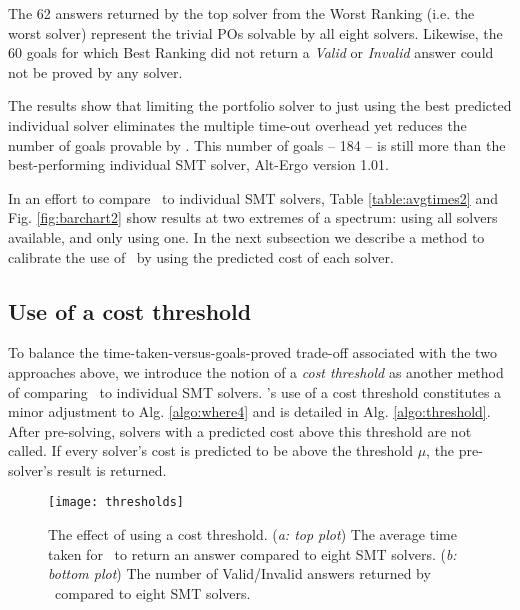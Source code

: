 The 62  answers returned by the top solver from the \textsf{Worst Ranking} (i.e. the worst solver) represent the trivial POs solvable by all eight solvers. 
Likewise, the 60 goals for which \textsf{Best Ranking} did not return a \textit{Valid} or \textit{Invalid} answer could not be proved by any solver.

The results show that limiting the portfolio solver to just using the best predicted individual solver eliminates the multiple time-out overhead yet reduces the number of goals provable by \where.
This number of goals -- 184 -- is still more than the best-performing individual SMT solver, Alt-Ergo version 1.01.  

In an effort to compare \where~to individual SMT solvers, Table \ref{table:avgtimes2} and Fig. \ref{fig:barchart2} show results at two extremes of a spectrum: using all solvers available, and only using one.
In the next subsection we describe a method to calibrate the use of \where~by using the predicted cost of each solver. 


\subsection{Use of a cost threshold}
\label{sub:threshold}

To balance the time-taken-versus-goals-proved trade-off associated with the two approaches above, we introduce the notion of a \textit{cost threshold} as another method of comparing \where~to individual SMT solvers.
\where's use of a cost threshold constitutes a minor adjustment to Alg. \ref{algo:where4} and is detailed in Alg. \ref{algo:threshold}. 
After pre-solving, solvers with a predicted cost above this threshold are not called. 
If every solver's cost is predicted to be above the threshold $\mu$, the pre-solver's result is returned.


\begin{figure}
	\centering
	\texttt{[image: thresholds]}
	\caption[The effect of using a cost threshold]{The effect of using a cost threshold. (\textit{a: top plot}) The average time taken for \where~to return an answer compared to eight SMT solvers. (\textit{b: bottom plot}) The number of Valid/Invalid answers returned by \where~compared to eight SMT solvers.}
	\label{fig:thresholds}
\end{figure}



